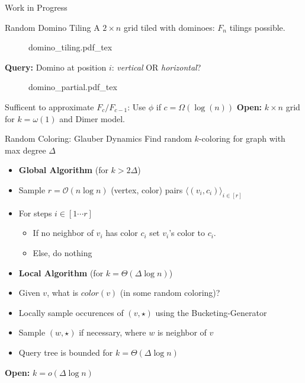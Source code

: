 \begin{block}{Work in Progress}



\begin{alertblock}{Random Domino Tiling}
A $2\times n$ grid tiled with dominoes: $F_n$ tilings possible.
\begin{figure}[h!]\centering
    \def\svgwidth{0.8\columnwidth}
    {domino_tiling.pdf_tex}
\end{figure}
\textbf{Query:} Domino at position $i$: \emph{vertical} OR \emph{horizontal}?
\begin{figure}[h!]\centering
    \def\svgwidth{0.8\columnwidth}
    {domino_partial.pdf_tex}
\end{figure}
Sufficent to approximate $F_c/F_{c-1}$: Use $\phi$ if $c = \Omega(\log(n))$
\textbf{Open:} $k\times n$ grid for $k = \omega(1)$ and Dimer model.
\end{alertblock}


\begin{alertblock}{Random Coloring: Glauber Dynamics}
Find random $k$-coloring for graph with max degree $\Delta$
\begin{itemize}
    \item [] \textbf{Global Algorithm} (for $k > 2\Delta$)
    \item Sample $r=\mathcal O(n\log n)$ (vertex, color) pairs $\langle(v_i, c_i)\rangle_{i\in[r]}$
    \item For steps $i\in [1\cdots r]$
    \begin{itemize}
        \item If no neighbor of $v_i$  has color $c_i$ set $v_i$'s color to $c_i$.
        \item Else, do nothing
    \end{itemize}
\end{itemize}

\begin{itemize}
    \item [] \textbf{Local Algorithm} (for $k = \Theta(\Delta\log n)$)
    \item Given $v$, what is $color(v)$ (in some random coloring)?
    \item Locally sample occurences of $(v, \star)$ using the {Bucketing-Generator}
    \item Sample $(w, \star)$ if necessary, where $w$ is neighbor of $v$
    \item Query tree is bounded for $k = \Theta(\Delta\log n)$
\end{itemize}
\textbf{Open:} $k = o(\Delta\log n)$
\end{alertblock}




\end{block}
